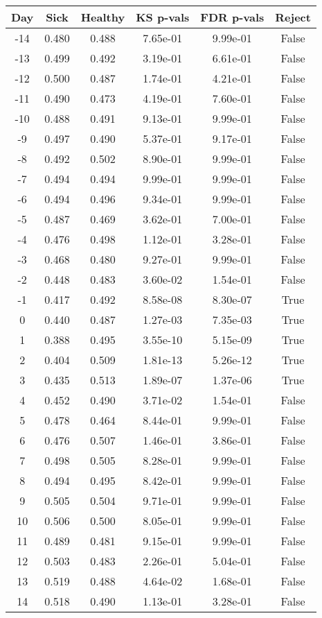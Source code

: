 \begin{tabular}{c|c|c|c|c|c}
Day &  Sick & Healthy &  KS p-vals & FDR p-vals & Reject\\
\hline
-14 & 0.480 &   0.488 &   7.65e-01 &   9.99e-01 &  False\\
-13 & 0.499 &   0.492 &   3.19e-01 &   6.61e-01 &  False\\
-12 & 0.500 &   0.487 &   1.74e-01 &   4.21e-01 &  False\\
-11 & 0.490 &   0.473 &   4.19e-01 &   7.60e-01 &  False\\
-10 & 0.488 &   0.491 &   9.13e-01 &   9.99e-01 &  False\\
 -9 & 0.497 &   0.490 &   5.37e-01 &   9.17e-01 &  False\\
 -8 & 0.492 &   0.502 &   8.90e-01 &   9.99e-01 &  False\\
 -7 & 0.494 &   0.494 &   9.99e-01 &   9.99e-01 &  False\\
 -6 & 0.494 &   0.496 &   9.34e-01 &   9.99e-01 &  False\\
 -5 & 0.487 &   0.469 &   3.62e-01 &   7.00e-01 &  False\\
 -4 & 0.476 &   0.498 &   1.12e-01 &   3.28e-01 &  False\\
 -3 & 0.468 &   0.480 &   9.27e-01 &   9.99e-01 &  False\\
 -2 & 0.448 &   0.483 &   3.60e-02 &   1.54e-01 &  False\\
 -1 & 0.417 &   0.492 &   8.58e-08 &   8.30e-07 &   True\\
  0 & 0.440 &   0.487 &   1.27e-03 &   7.35e-03 &   True\\
  1 & 0.388 &   0.495 &   3.55e-10 &   5.15e-09 &   True\\
  2 & 0.404 &   0.509 &   1.81e-13 &   5.26e-12 &   True\\
  3 & 0.435 &   0.513 &   1.89e-07 &   1.37e-06 &   True\\
  4 & 0.452 &   0.490 &   3.71e-02 &   1.54e-01 &  False\\
  5 & 0.478 &   0.464 &   8.44e-01 &   9.99e-01 &  False\\
  6 & 0.476 &   0.507 &   1.46e-01 &   3.86e-01 &  False\\
  7 & 0.498 &   0.505 &   8.28e-01 &   9.99e-01 &  False\\
  8 & 0.494 &   0.495 &   8.42e-01 &   9.99e-01 &  False\\
  9 & 0.505 &   0.504 &   9.71e-01 &   9.99e-01 &  False\\
 10 & 0.506 &   0.500 &   8.05e-01 &   9.99e-01 &  False\\
 11 & 0.489 &   0.481 &   9.15e-01 &   9.99e-01 &  False\\
 12 & 0.503 &   0.483 &   2.26e-01 &   5.04e-01 &  False\\
 13 & 0.519 &   0.488 &   4.64e-02 &   1.68e-01 &  False\\
 14 & 0.518 &   0.490 &   1.13e-01 &   3.28e-01 &  False\\
\end{tabular}